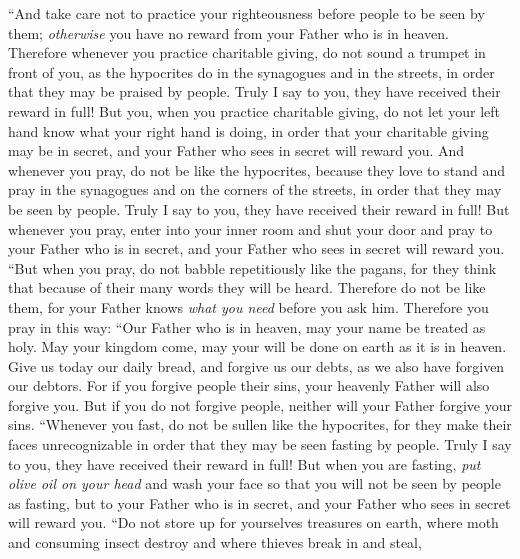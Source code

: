\begin{biblechapter} %
 “And take care not to practice your righteousness before people to be seen by them; \textit{otherwise} you have no reward from your Father who is in heaven.
\verse Therefore whenever you practice charitable giving, do not sound a trumpet in front of you, as the hypocrites do in the synagogues and in the streets, in order that they may be praised by people. Truly I say to you, they have received their reward in full!
\verse But you, when you practice charitable giving, do not let your left hand know what your right hand is doing,
\verse in order that your charitable giving may be in secret, and your Father who sees in secret will reward you.
 And whenever you pray, do not be like the hypocrites, because they love to stand and pray in the synagogues and on the corners of the streets, in order that they may be seen by people. Truly I say to you, they have received their reward in full!
\verse But whenever you pray, enter into your inner room and shut your door and pray to your Father who is in secret, and your Father who sees in secret will reward you.
\verse “But when you pray, do not babble repetitiously like the pagans, for they think that because of their many words they will be heard.
\verse Therefore do not be like them, for your Father knows \textit{what you need} before you ask him.
\verse Therefore you pray in this way:
\verse “Our Father who is in heaven, 
may your name be treated as holy.
\verse May your kingdom come, 
may your will be done 
on earth as it is in heaven.
\verse Give us today our daily bread,
\verse and forgive us our debts, 
as we also have forgiven our debtors.
\verse For if you forgive people their sins, your heavenly Father will also forgive you.
\verse But if you do not forgive people, neither will your Father forgive your sins.
 “Whenever you fast, do not be sullen like the hypocrites, for they make their faces unrecognizable in order that they may be seen fasting by people. Truly I say to you, they have received their reward in full!
\verse But when you are fasting, \textit{put olive oil on your head} and wash your face
\verse so that you will not be seen by people as fasting, but to your Father who is in secret, and your Father who sees in secret will reward you.
 “Do not store up for yourselves treasures on earth, where moth and consuming insect destroy and where thieves break in and steal,

\end{biblechapter}
